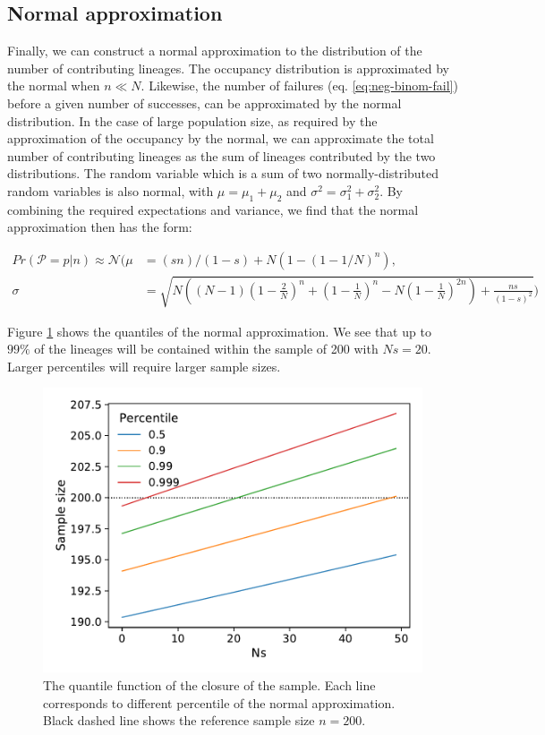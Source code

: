 \documentclass[review]{elsarticle}
\begin{document}
\subsection{Normal approximation}

Finally, we can construct a normal approximation to the distribution of the number of contributing
lineages. The occupancy distribution is approximated by the normal \cite{ONeill2019} when $n \ll N$.
Likewise, the number of failures (eq. \eqref{eq:neg-binom-fail}) before a given number of successes,
can be approximated by the normal distribution. In the case of large population size, as required by
the approximation of the occupancy by the normal, we can approximate the total number of
contributing lineages as the sum of lineages contributed by the two distributions. The random
variable which is a sum of two normally-distributed random variables is also normal, with
$\mu=\mu_1+\mu_2$ and $\sigma^2 = \sigma^2_1 + \sigma^2_2$. By combining the required expectations
and variance, we find that the normal approximation then has the form:

\begin{align}
  Pr(\mathcal{P}=p|n) \approx \mathcal{N}( \mu &= (s n)/(1 - s) + N (1 - (1 - 1/N)^n),\\
  \sigma &= \sqrt{N \left((N-1) \left(1-\frac{2}{N}\right)^n+\left(1-\frac{1}{N}\right)^n-N\left(1-\frac{1}{N}\right)^{2 n}\right)+\frac{n s}{(1-s)^2}})
\end{align}

Figure \ref{fig:normal-approximation} shows the quantiles of the normal approximation. We see that
up to $99\%$ of the lineages will be contained within the sample of 200 with $Ns=20$. Larger
percentiles will require larger sample sizes.

\begin{figure}
  \centering
  \includegraphics[]{fig/quantile.pdf}
   \caption{The quantile function of the closure of the sample. Each line corresponds to different
     percentile of the normal approximation. Black dashed line shows the reference sample size $n=200$.}
  \label{fig:normal-approximation}
\end{figure}
\end{document}
